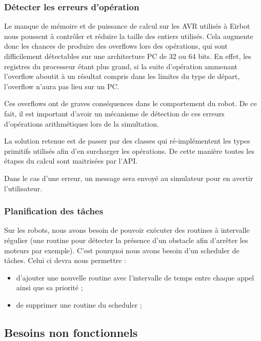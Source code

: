 
\subsubsection{Détecter les erreurs d'opération}

Le manque de mémoire et de puissance de calcul sur les AVR utilisés à Eirbot nous poussent à contrôler et réduire la taille des entiers utilisés. Cela augmente donc les chances de produire des overflows lors des opérations, qui sont difficilement détectables sur une architecture PC de 32 ou 64 bits. En effet, les registres du processeur étant plus grand, si la suite d'opération ammenant l'overflow aboutit à un résultat compris dans les limites du type de départ, l'overflow n'aura pas lieu sur un PC.

Ces overflows ont de graves conséquences dans le comportement du robot. De ce fait, il est important d'avoir un mécanisme de détection de ces erreurs d'opérations arithmétiques lors de la simultation.

La solution retenue est de passer par des classes qui ré-implémentent les types primitifs utilisés afin d'en surcharger les opérations. De cette manière toutes les étapes du calcul sont maitrisées par l'API.

Dans le cas d'une erreur, un message sera envoyé au simulateur pour en avertir l'utilisateur.

\subsubsection{Planification des tâches}

Sur les robots, nous avons besoin de pouvoir exécuter des routines à intervalle régulier (une routine pour détecter la présence d'un obstacle afin d'arrêter les moteurs par exemple). C'est pourquoi nous avons besoin d'un scheduler de tâches. Celui ci devra nous permettre :
\begin{itemize}
    \item d'ajouter une nouvelle routine avec l'intervalle de temps entre chaque appel ainsi que sa priorité ;
    \item de supprimer une routine du scheduler ;
\end{itemize}

\subsection{Besoins non fonctionnels}

